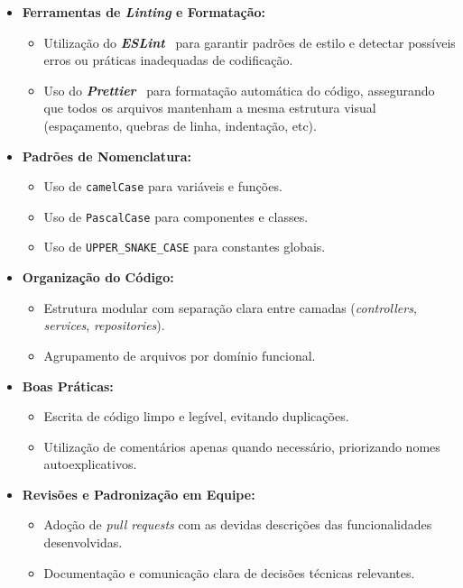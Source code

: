 \begin{itemize}
  \item \textbf{Ferramentas de \textit{Linting} e Formatação:}
  \begin{itemize}
    \item Utilização do \textbf{\textit{ESLint}}~\cite{eslint-2025} para garantir padrões de estilo e detectar possíveis erros ou práticas inadequadas de codificação.
    \item Uso do \textbf{\textit{Prettier}}~\cite{prettier-2025} para formatação automática do código, assegurando que todos os arquivos mantenham a mesma estrutura visual (espaçamento, quebras de linha, indentação, etc).
  \end{itemize}

  \item \textbf{Padrões de Nomenclatura:}
  \begin{itemize}
    \item Uso de \texttt{camelCase} para variáveis e funções.
    \item Uso de \texttt{PascalCase} para componentes e classes.
    \item Uso de \texttt{UPPER\_SNAKE\_CASE} para constantes globais.
  \end{itemize}

  \item \textbf{Organização do Código:}
  \begin{itemize}
    \item Estrutura modular com separação clara entre camadas (\textit{controllers}, \textit{services}, \textit{repositories}).
    \item Agrupamento de arquivos por domínio funcional.
  \end{itemize}

  \item \textbf{Boas Práticas:}
  \begin{itemize}
    \item Escrita de código limpo e legível, evitando duplicações.
    \item Utilização de comentários apenas quando necessário, priorizando nomes autoexplicativos.
  \end{itemize}

  \item \textbf{Revisões e Padronização em Equipe:}
  \begin{itemize}
    \item Adoção de \textit{pull requests} com as devidas descrições das funcionalidades desenvolvidas.
    \item Documentação e comunicação clara de decisões técnicas relevantes.
  \end{itemize}
\end{itemize}
